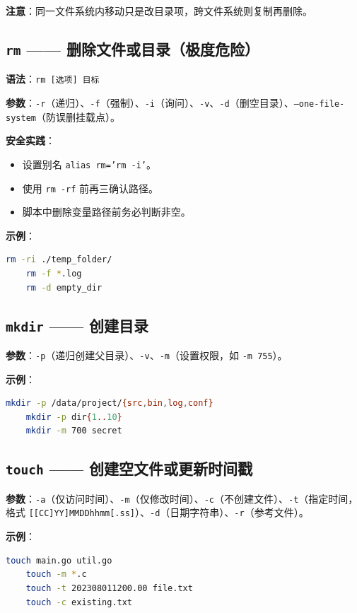 \textbf{注意}：同一文件系统内移动只是改目录项，跨文件系统则复制再删除。

\subsection{\texttt{rm} —— 删除文件或目录（极度危险）} \textbf{语法}：\texttt{rm [选项] 目标}

\textbf{参数}：\texttt{-r}（递归）、\texttt{-f}（强制）、\texttt{-i}（询问）、\texttt{-v}、\texttt{-d}（删空目录）、\texttt{--one-file-system}（防误删挂载点）。

\textbf{安全实践}：
\begin{itemize}
\item 设置别名 \texttt{alias rm='rm -i'}。
\item 使用 \texttt{rm -rf} 前再三确认路径。
\item 脚本中删除变量路径前务必判断非空。
\end{itemize}

\textbf{示例}：
\begin{lstlisting}[language=bash]
	rm -ri ./temp_folder/
	rm -f *.log
	rm -d empty_dir
\end{lstlisting}

\subsection{\texttt{mkdir} —— 创建目录} \textbf{参数}：\texttt{-p}（递归创建父目录）、\texttt{-v}、\texttt{-m}（设置权限，如 \texttt{-m 755}）。

\textbf{示例}：
\begin{lstlisting}[language=bash]
	mkdir -p /data/project/{src,bin,log,conf}
	mkdir -p dir{1..10}
	mkdir -m 700 secret
\end{lstlisting}

\subsection{\texttt{touch} —— 创建空文件或更新时间戳} \textbf{参数}：\texttt{-a}（仅访问时间）、\texttt{-m}（仅修改时间）、\texttt{-c}（不创建文件）、\texttt{-t}（指定时间，格式 \texttt{[[CC]YY]MMDDhhmm[.ss]}）、\texttt{-d}（日期字符串）、\texttt{-r}（参考文件）。

\textbf{示例}：
\begin{lstlisting}[language=bash]
	touch main.go util.go
	touch -m *.c
	touch -t 202308011200.00 file.txt
	touch -c existing.txt
\end{lstlisting}


